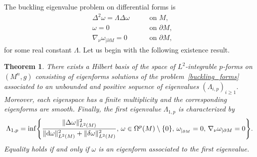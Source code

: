\documentclass[pdftex]{sigma}
\numberwithin{equation}{section}
\newtheorem{Theorem}{Theorem}[section]
\theoremstyle{definition}
\begin{document}
The buckling eigenvalue problem on differential forms is
\begin{equation}\label{buckling_forms}
\begin{aligned}
&\Delta^2 \omega=\Lambda \Delta \omega \ \quad &&\textrm{on } M, \\
&\omega=0\ \quad &&\textrm{on }\partial M, \\
&\nabla_\nu\omega_{|\partial M}=0\ \quad &&\textrm{on }\partial M ,
\end{aligned}
\end{equation}
for some real constant $\Lambda$.
Let us begin with the following existence result.
\begin{Theorem}\label{BucKPb}
There exists a Hilbert basis of the space of $L^2$-integrable $p$-forms on $(M^n,g)$ consisting of eigenforms solutions of the problem~\eqref{buckling_forms} associated to an unbounded and positive sequence of eigenvalues $(\Lambda_{i,p})_{i\geq 1}$. Moreover, each eigenspace has a finite multiplicity and the corresponding eigenforms are smooth.
Finally, the first eigenvalue $\Lambda_{1,p}$ is characterized by
\begin{gather}\label{eq:charb}
\Lambda_{1,p}=\inf\Biggl\{\frac{\|\Delta\omega\|_{L^2(M)}^2}{
\| {\rm d}\omega\|_{L^2(M)}^2+\|\delta \omega \|_{L^2(M)}^2},\, \omega\in\Omega^p(M)\setminus\{0\},\, \omega_{|_{\partial
M}}=0,\, \nabla_\nu\omega_{|\partial M}=0\Biggr\}.
\end{gather}
Equality holds if and only if $\omega$ is an eigenform associated to the first eigenvalue.
\end{Theorem}
\end{document}
